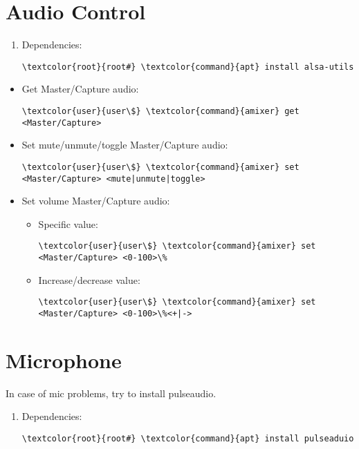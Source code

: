 \documentclass[10pt, a4paper, onecolumn, openany]{book} %
\begin{document}
\section{Audio Control}
\begin{enumerate}
    \item Dependencies:
\begin{Verbatim}[commandchars=\\\{\}]
\textcolor{root}{root#} \textcolor{command}{apt} install alsa-utils
\end{Verbatim}
\end{enumerate}
\begin{itemize}
    \item Get Master/Capture audio:
\begin{Verbatim}[commandchars=\\\{\}]
\textcolor{user}{user\$} \textcolor{command}{amixer} get <Master/Capture>
\end{Verbatim}
    \item Set mute/unmute/toggle Master/Capture audio:
\begin{Verbatim}[commandchars=\\\{\}]
\textcolor{user}{user\$} \textcolor{command}{amixer} set <Master/Capture> <mute|unmute|toggle>
\end{Verbatim}
    \item Set volume Master/Capture audio:
    \begin{itemize}
        \item Specific value:
\begin{Verbatim}[commandchars=\\\{\}]
\textcolor{user}{user\$} \textcolor{command}{amixer} set <Master/Capture> <0-100>\%
\end{Verbatim}
        \item Increase/decrease value:
\begin{Verbatim}[commandchars=\\\{\}]
\textcolor{user}{user\$} \textcolor{command}{amixer} set <Master/Capture> <0-100>\%<+|->    
\end{Verbatim}
    \end{itemize}
\end{itemize}
\section{Microphone}
In case of mic problems, try to install pulseaudio.
\begin{enumerate}
    \item Dependencies:
\begin{Verbatim}[commandchars=\\\{\}]
\textcolor{root}{root#} \textcolor{command}{apt} install pulseaduio
\end{Verbatim}
\end{enumerate}
\end{document}

